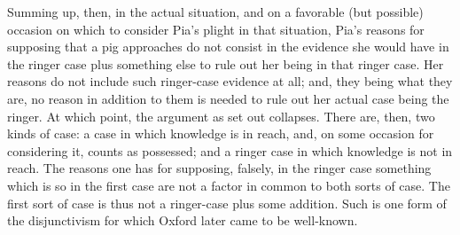 Summing up, then, in the actual situation, and on a favorable (but possible) occasion on which to consider Pia’s plight in that situation, Pia's reasons for supposing that a pig approaches do not consist in the evidence she would have in the ringer case plus something else to rule out her being in that ringer case. Her reasons do not include such ringer-case evidence at all; and, they being what they are, no reason in addition to them is needed to rule out her actual case being the ringer. At which point, the argument as set out collapses. There are, then, two kinds of case: a case in which knowledge is in reach, and, on some occasion for considering it, counts as possessed; and a ringer case in which knowledge is not in reach. The reasons one has for supposing, falsely, in the ringer case something which is so in the first case are not a factor in common to both sorts of case. The first sort of case is thus not a ringer-case plus some addition. Such is one form of the disjunctivism for which Oxford later came to be well-known.

